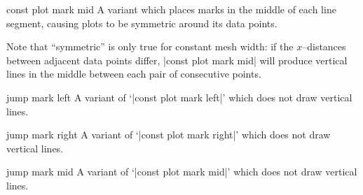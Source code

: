 {\begin{plottype}{const plot mark mid}
 A variant which places marks in the middle of each line segment, causing plots to be symmetric around its data points.
\begin{codeexample}[]
\end{codeexample}
	Note that ``symmetric'' is only true for constant mesh width: if the $x$--distances between adjacent data points differ, |const plot mark mid| will produce vertical lines in the middle between each pair of consecutive points.
\end{plottype}

\begin{plottype}{jump mark left}
A variant of `|const plot mark left|' which does not draw vertical lines.
\begin{codeexample}[]
\end{codeexample}
\end{plottype}

\begin{plottype}{jump mark right}
A variant of `|const plot mark right|' which does not draw vertical lines.
\end{plottype}

\begin{plottype}{jump mark mid}
 A variant of `|const plot mark mid|' which does not draw vertical lines.
\begin{codeexample}[]
\end{codeexample}
\end{plottype}

}
